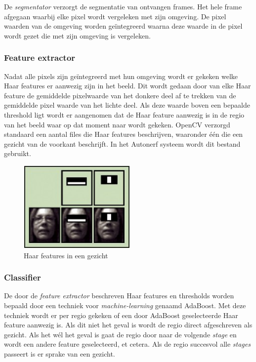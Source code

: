 De \emph{segmentator} verzorgt de segmentatie van ontvangen frames. Het hele frame
afgegaan waarbij elke pixel wordt vergeleken met zijn omgeving. De pixel waarden
van de omgeving worden geïntegreerd waarna deze waarde in de pixel wordt gezet
die met zijn omgeving is vergeleken.

\subsubsection{Feature extractor}

Nadat alle pixels zijn geïntegreerd met hun omgeving wordt er gekeken welke Haar
features er aanwezig zijn in het beeld. Dit wordt gedaan door van elke Haar
feature de gemiddelde pixelwaarde van het donkere deel af te trekken van de
gemiddelde pixel waarde van het lichte deel. Als deze waarde boven een bepaalde
threshold ligt wordt er aangenomen dat de Haar feature aanwezig is in de regio
van het beeld waar op dat moment naar wordt gekeken. OpenCV verzorgd standaard
een aantal files die Haar features beschrijven, waaronder één die een gezicht
van de voorkant beschrijft. In het Autonerf systeem wordt dit bestand gebruikt.

\begin{figure}[H]
    \begin{center}
        \includegraphics[scale=0.75]{figures/haar-features.png}
        \caption{Haar features in een gezicht}
    \end{center}
\end{figure}

\vfill
\pagebreak

\subsubsection{Classifier}

De door de \emph{feature extractor} beschreven Haar features en thresholds worden
bepaald door een techniek voor \emph{machine-learning} genaamd AdaBoost. Met deze
techniek wordt er per regio gekeken of een door AdaBoost geselecteerde Haar
feature aanwezig is. Als dit niet het geval is wordt de regio direct afgeschreven
als gezicht. Als het wél het geval is gaat de regio door naar de volgende \emph{stage}
en wordt een andere feature geselecteerd, et cetera. Als de regio succesvol alle
\emph{stages} passeert is er sprake van een gezicht.

